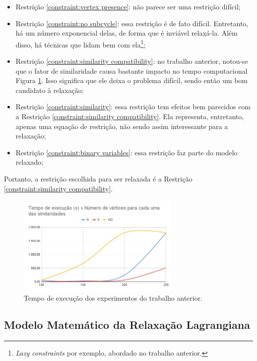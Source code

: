 \documentclass{article}
\newcommand{\constraintRef}[1]{Restrição \ref{#1}}
\newcommand{\figref}[1]{Figura \ref{#1}}
\begin{document}
\begin{itemize}
	\item \constraintRef{constraint:vertex presence}: não parece ser uma restrição difícil;
	\item \constraintRef{constraint:no subcycle}: essa restrição é de fato difícil. Entretanto, há um número exponencial delas, de forma que é inviável relaxá-la. Além disso, há técnicas que lidam bem com ela\footnote{\textit{Lazy constraints} por exemplo, abordado no trabalho anterior.};
	\item \constraintRef{constraint:similarity compatibility}: no trabalho anterior, notou-se que o fator de similaridade causa bastante impacto no tempo computacional \figref{figure:previous running time}. Isso significa que ele deixa o problema difícil, sendo então um bom candidato à relaxação;
	\item \constraintRef{constraint:similarity}: essa restrição tem efeitos bem parecidos com a \constraintRef{constraint:similarity compatibility}. Ela representa, entretanto, apenas uma equação de restrição, não sendo assim interessante para a relaxação;
	\item \constraintRef{constraint:binary variables}: essa restrição faz parte do modelo relaxado;
\end{itemize}

Portanto, a restrição escolhida para ser relaxada é a \constraintRef{constraint:similarity compatibility}.

\begin{figure}[]
    \centering
    \includegraphics[width=0.7\textwidth]{images/running_time.jpeg}
    \caption{Tempo de execução dos experimentos do trabalho anterior.}
    \label{figure:previous running time}
\end{figure}

\subsection{Modelo Matemático da Relaxação Lagrangiana}
\label{subsec:lagrangian relaxation}
\end{document}
